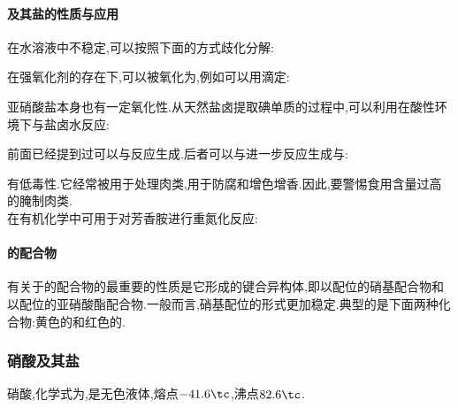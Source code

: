 \documentclass{ctexart}
\begin{document}
\paragraph{及其盐的性质与应用}
在水溶液中不稳定,可以按照下面的方式歧化分解:
\begin{center}
\end{center}
在强氧化剂的存在下,可以被氧化为,例如可以用滴定:
\begin{center}
\end{center}
亚硝酸盐本身也有一定氧化性.从天然盐卤提取碘单质的过程中,可以利用在酸性环境下与盐卤水反应:
\begin{center}
\end{center}
前面已经提到过可以与反应生成.后者可以与进一步反应生成与:
\begin{center}
\end{center}
\indent {}有低毒性.它经常被用于处理肉类,用于防腐和增色增香.因此,要警惕食用含量过高的腌制肉类.\\
\indent {}在有机化学中可用于对芳香胺进行重氮化反应:
\begin{center}
\end{center}
\paragraph{的配合物}
有关于的配合物的最重要的性质是它形成的键合异构体,即以配位的硝基配合物和以配位的亚硝酸酯配合物.一般而言,硝基配位的形式更加稳定.典型的是下面两种化合物:黄色的和红色的.

\subsubsection{硝酸及其盐}
\begin{substance}[\ce{HNO3}]
    硝酸,化学式为,是无色液体,熔点$-41.6\tc$,沸点$82.6\tc$.
\end{substance}
\end{document}
